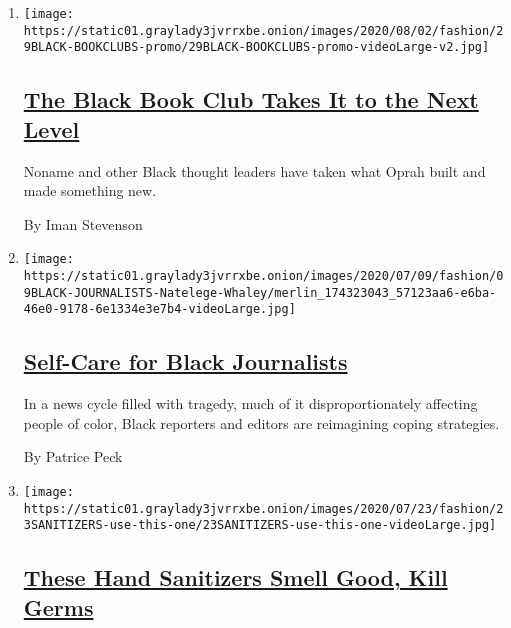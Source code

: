 \begin{enumerate}
\def\labelenumi{\arabic{enumi}.}
\item
  \texttt{[image: https://static01.graylady3jvrrxbe.onion/images/2020/08/02/fashion/29BLACK-BOOKCLUBS-promo/29BLACK-BOOKCLUBS-promo-videoLarge-v2.jpg]}

  \hypertarget{the-black-book-club-takes-it-to-the-next-level}{%
  \subsection{\texorpdfstring{\href{/2020/07/29/style/self-care/black-book-clubs.html}{The
  Black Book Club Takes It to the Next
  Level}}{The Black Book Club Takes It to the Next Level}}\label{the-black-book-club-takes-it-to-the-next-level}}

  Noname and other Black thought leaders have taken what Oprah built and
  made something new.

  By Iman Stevenson
\item
  \texttt{[image: https://static01.graylady3jvrrxbe.onion/images/2020/07/09/fashion/09BLACK-JOURNALISTS-Natelege-Whaley/merlin\_174323043\_57123aa6-e6ba-46e0-9178-6e1334e3e7b4-videoLarge.jpg]}

  \hypertarget{self-care-for-black-journalists}{%
  \subsection{\texorpdfstring{\href{/2020/07/14/style/self-care/black-journalists.html}{Self-Care
  for Black
  Journalists}}{Self-Care for Black Journalists}}\label{self-care-for-black-journalists}}

  In a news cycle filled with tragedy, much of it disproportionately
  affecting people of color, Black reporters and editors are reimagining
  coping strategies.

  By Patrice Peck
\item
  \texttt{[image: https://static01.graylady3jvrrxbe.onion/images/2020/07/23/fashion/23SANITIZERS-use-this-one/23SANITIZERS-use-this-one-videoLarge.jpg]}

  \hypertarget{these-hand-sanitizers-smell-good-kill-germs}{%
  \subsection{\texorpdfstring{\href{/2020/07/22/style/these-hand-sanitizers-smell-good-kill-germs.html}{These
  Hand Sanitizers Smell Good, Kill
  Germs}}{These Hand Sanitizers Smell Good, Kill Germs}}\label{these-hand-sanitizers-smell-good-kill-germs}}


\end{enumerate}

